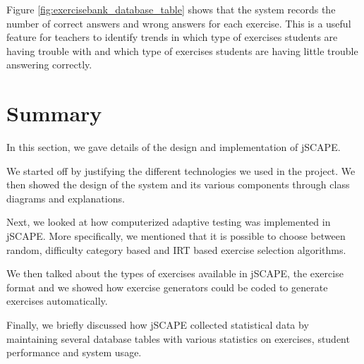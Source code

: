 Figure \ref{fig:exercisebank_database_table} shows that the system records the number of correct answers and wrong answers for each exercise. This is a useful feature for teachers to identify trends in which type of exercises students are having trouble with and which type of exercises students are having little trouble answering correctly.

\section{Summary}
In this section, we gave details of the design and implementation of jSCAPE.\newline

We started off by justifying the different technologies we used in the project. We then showed the design of the system and its various components through class diagrams and explanations.\newline

Next, we looked at how computerized adaptive testing was implemented in jSCAPE. More specifically, we mentioned that it is possible to choose between random, difficulty category based and IRT based exercise selection algorithms. \newline

We then talked about the types of exercises available in jSCAPE, the exercise format and we showed how exercise generators could be coded to generate exercises automatically.\newline

Finally, we briefly discussed how jSCAPE collected statistical data by maintaining several database tables with various statistics on exercises, student performance and system usage.
